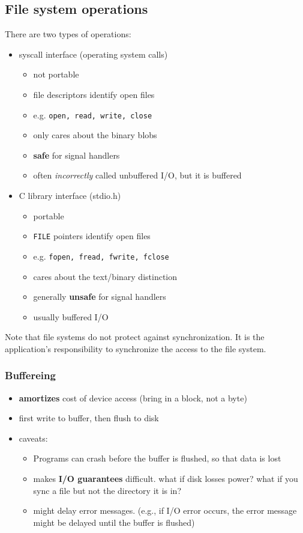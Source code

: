 \documentclass[letterpaper,12pt]{article}
\begin{document}
\subsection{File system operations}
There are two types of operations:
\begin{itemize}
    \item syscall interface (operating system calls)\begin{itemize}
        \item not portable
        \item file descriptors identify open files 
        \item e.g. \texttt{open, read, write, close}
        \item only cares about the binary blobs
        \item \textbf{safe} for signal handlers
        \item often \textit{incorrectly} called unbuffered I/O, but it is buffered
    \end{itemize}
    \item C library interface (stdio.h)\begin{itemize}
        \item portable
        \item \texttt{FILE} pointers identify open files
        \item e.g. \texttt{fopen, fread, fwrite, fclose}
        \item cares about the text/binary distinction
        \item generally \textbf{unsafe} for signal handlers
        \item usually buffered I/O
    \end{itemize} 
\end{itemize}
Note that file systems do not protect against synchronization. It is the application's responsibility to synchronize the access to the file system.
\subsubsection{Buffereing}
\begin{itemize}
    \item \textbf{amortizes} cost of device access (bring in a block, not a byte)
    \item first write to buffer, then flush to disk
    \item caveats: \begin{itemize}
        \item Programs can crash before the buffer is flushed, so that data is lost
        \item makes \textbf{I/O guarantees} difficult. what if disk losses power? what if you sync a file but not the directory it is in?
        \item might delay error messages. (e.g., if I/O error occurs, the error message might be delayed until the buffer is flushed)
    \end{itemize}
\end{itemize}
\end{document}
